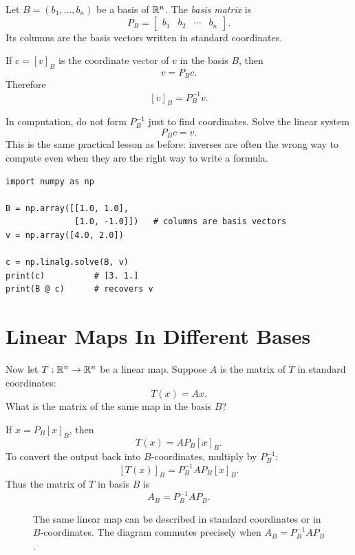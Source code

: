 \begin{definition}
Let $B=(b_1,\ldots,b_n)$ be a basis of $\mathbb{R}^n$. The \emph{basis matrix} is
\[
  P_B=\begin{bmatrix}b_1&b_2&\cdots&b_n\end{bmatrix}.
\]
Its columns are the basis vectors written in standard coordinates.
\end{definition}

If $c=[v]_B$ is the coordinate vector of $v$ in the basis $B$, then
\[
  v=P_Bc.
\]
Therefore
\[
  [v]_B=P_B^{-1}v.
\]

\begin{computebox}
In computation, do not form $P_B^{-1}$ just to find coordinates. Solve the
linear system
\[
  P_Bc=v.
\]
This is the same practical lesson as before: inverses are often the wrong way
to compute even when they are the right way to write a formula.
\end{computebox}

\begin{lstlisting}
import numpy as np

B = np.array([[1.0, 1.0],
              [1.0, -1.0]])   # columns are basis vectors
v = np.array([4.0, 2.0])

c = np.linalg.solve(B, v)
print(c)          # [3. 1.]
print(B @ c)      # recovers v
\end{lstlisting}

\section{Linear Maps In Different Bases}

Now let $T:\mathbb{R}^n\to\mathbb{R}^n$ be a linear map. Suppose $A$ is the matrix of $T$ in
standard coordinates:
\[
  T(x)=Ax.
\]
What is the matrix of the same map in the basis $B$?

If $x=P_B[x]_B$, then
\[
  T(x)=A P_B[x]_B.
\]
To convert the output back into $B$-coordinates, multiply by $P_B^{-1}$:
\[
  [T(x)]_B=P_B^{-1}A P_B[x]_B.
\]
Thus the matrix of $T$ in basis $B$ is
\[
  A_B=P_B^{-1}AP_B.
\]

\begin{figure}[htbp]
  \centering
  \caption{The same linear map can be described in standard coordinates or in
  $B$-coordinates. The diagram commutes precisely when
  $A_B=P_B^{-1}AP_B$.}
\end{figure}

